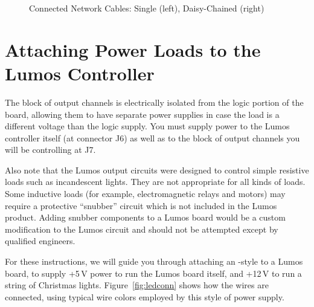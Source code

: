\documentclass[letterpaper,twoside,onecolumn,openright,final]{memoir}
\begin{document}
\begin{figure}
	\caption{Connected Network Cables: Single (left), Daisy-Chained (right)\label{fig:wiring485cables}}
\end{figure}

\section{Attaching Power Loads to the Lumos Controller}
The block of output channels is electrically isolated from the logic portion of the board, allowing them to have
separate power supplies in case the load is a different voltage than the logic supply.
You must supply power to the Lumos controller itself (at connector J6) as well as to the block of 
output channels you will be controlling at J7.

Also note that the Lumos output circuits were designed to control simple resistive loads such as
incandescent lights.  They are not appropriate for all kinds of loads.  Some inductive loads
(for example, electromagnetic relays and motors) may require a protective ``snubber'' circuit
which is not included in the Lumos product.  Adding snubber components to a Lumos board would be
a custom modification to the Lumos circuit and should not be attempted except by qualified engineers.

For these instructions, we will guide you through attaching an -style  to a 
Lumos board, to supply +5\,V power to run the Lumos board itself, and +12\,V to run a string of  
Christmas lights.  Figure~\ref{fig:ledconn} shows how the wires are connected, using typical wire colors
employed by this style of power supply.
\end{document}
